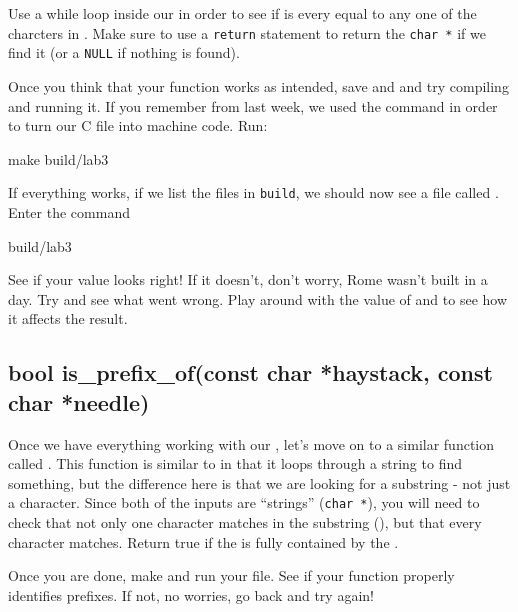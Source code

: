 \documentclass{tufte-handout}
\begin{document}
Use a while loop inside our  in order to see if
 is every equal to any one of the charcters in
.
Make sure to use a \texttt{return} statement to return the
\verb!char *! if we find it (or a \texttt{NULL} if nothing is found).

Once you think that your function works as intended, save and and try
compiling and running it. If you
remember from last week, we used the  command in
order to turn our C file into machine code. Run:
\begin{CmdLine}
  \prompt make build/lab3
\end{CmdLine}
If everything works, if we list the files in \texttt{build}, we should now see a file called .  Enter the command
\begin{CmdLine}
  \prompt build/lab3
\end{CmdLine}
See if your value looks right!  If it doesn't, don't worry, Rome wasn't built in a day. Try and see what went wrong.  Play around with the value of  and  to see how it affects the result.

\subsection{{bool is\_prefix\_of(const char *haystack,
      const char *needle)}}

Once we have everything working with our , let's
move on to a similar function called
. This
function is similar to  in that it loops through
a string to find something, but the difference here is that we are
looking for a substring - not just a character. Since both of the inputs
are ``strings'' (\verb!char *!), you will need to check that not only one character matches in the substring (), but that every character matches. Return true if the  is fully contained by the .

Once you are done, make and run your file. See if your function properly identifies prefixes. If not, no worries, go back and try again!
\end{document}

